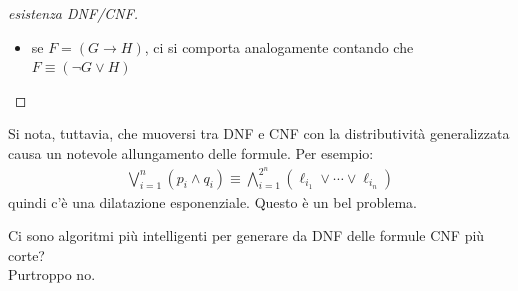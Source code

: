 \begin{proof}[esistenza DNF/CNF]
\begin{itemize}
\begin{itemize}
\begin{itemize}
\begin{align*}
              F & \equiv (G^c \lor H^c) \\ 
                & \equiv (G_1 \land \cdots \land G_u) \lor (H_1 \land \cdots \land H_v) \\
                & \equiv \bigwedge\limits_{i,j}(G_i \lor H_j) & \text{per Distributività Generalizzata}~(\ref{def:distributibilita-generalizzata})
            \end{align*}
            Ma visto che $G_i$ e $H_j$ sono \textit{clausole}, anche $(G_i \lor H_j)$ lo è.
            $$
            \implies F^c := \bigwedge\limits_{i=1}^u \bigwedge\limits_{j=1}^v (G_i \lor H_j) \in CNF
            $$
        \end{itemize}       
      \item se $F = (G \rightarrow H)$, ci si comporta analogamente contando che $F \equiv (\neg G \lor H)$      
    \end{itemize}
\end{itemize}
\end{proof}

Si nota, tuttavia, che muoversi tra DNF e CNF con la distributività generalizzata causa un notevole allungamento delle formule. Per esempio:
\begin{align*}
        \bigvee\limits_{i = 1}^{n} (p_i \land q_i) \equiv \bigwedge\limits_{i = 1}^{2^n}(\ell_{i_1} \lor \cdots \lor \ell_{i_n})
\end{align*}
quindi c'è una dilatazione esponenziale. Questo è un bel problema.


Ci sono algoritmi più intelligenti per generare da DNF delle formule CNF più corte? \\
Purtroppo no. 
